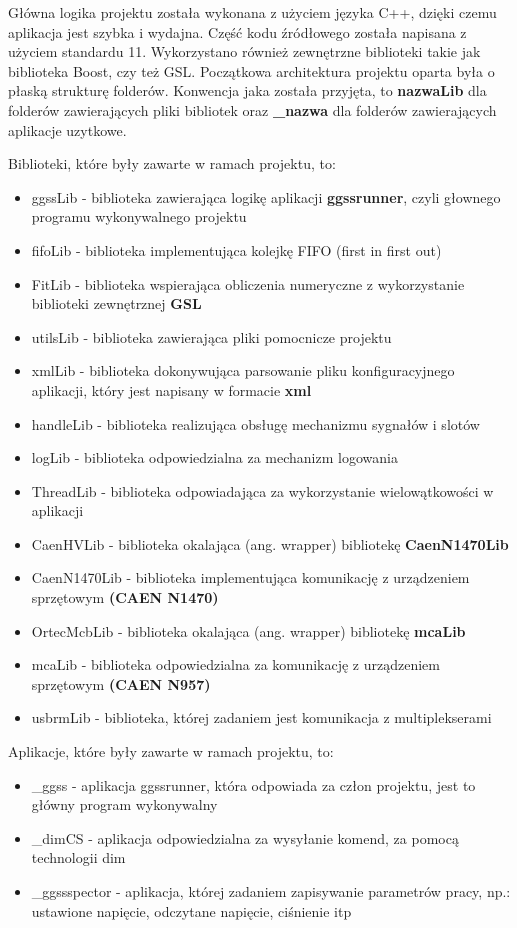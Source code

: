 Główna logika projektu została wykonana z użyciem języka C++, dzięki czemu aplikacja jest szybka i wydajna. Część kodu źródłowego została napisana z użyciem standardu 11. Wykorzystano również zewnętrzne biblioteki takie jak biblioteka Boost, czy też GSL. Początkowa architektura projektu oparta była o płaską strukturę folderów. Konwencja jaka została przyjęta, to \textbf{nazwaLib} dla folderów zawierających pliki bibliotek oraz \textbf{\_nazwa} dla folderów zawierających aplikacje uzytkowe.\par
\bigskip
Biblioteki, które były zawarte w ramach projektu, to:
\begin{itemize}
\item ggssLib - biblioteka zawierająca logikę aplikacji \textbf{ggssrunner}, czyli głownego programu wykonywalnego projektu
\item fifoLib - biblioteka implementująca kolejkę FIFO (first in first out)
\item FitLib - biblioteka wspierająca obliczenia numeryczne z wykorzystanie biblioteki zewnętrznej \textbf{GSL}
\item utilsLib - biblioteka zawierająca pliki pomocnicze projektu
\item xmlLib - biblioteka dokonywująca parsowanie pliku konfiguracyjnego aplikacji, który jest napisany w formacie \textbf{xml}
\item handleLib - biblioteka realizująca obsługę mechanizmu sygnałów i slotów
\item logLib - biblioteka odpowiedzialna za mechanizm logowania
\item ThreadLib - biblioteka odpowiadająca za wykorzystanie wielowątkowości w aplikacji
\item CaenHVLib - biblioteka okalająca (ang. wrapper) bibliotekę \textbf{CaenN1470Lib}
\item CaenN1470Lib - biblioteka implementująca komunikację z urządzeniem sprzętowym \textbf{(CAEN N1470)}
\item OrtecMcbLib - biblioteka okalająca (ang. wrapper) bibliotekę \textbf{mcaLib}
\item mcaLib - biblioteka odpowiedzialna za komunikację z urządzeniem sprzętowym \textbf{(CAEN N957)}
\item usbrmLib - biblioteka, której zadaniem jest komunikacja z multiplekserami
\end{itemize}

\par Aplikacje, które były zawarte w ramach projektu, to:
\begin{itemize}
\item \_ggss - aplikacja ggssrunner, która odpowiada za człon projektu, jest to główny program wykonywalny
\item \_dimCS - aplikacja odpowiedzialna za wysyłanie komend, za pomocą technologii dim
\item \_ggssspector - aplikacja, której zadaniem zapisywanie parametrów pracy, np.: ustawione napięcie, odczytane napięcie, ciśnienie itp
\end{itemize}

